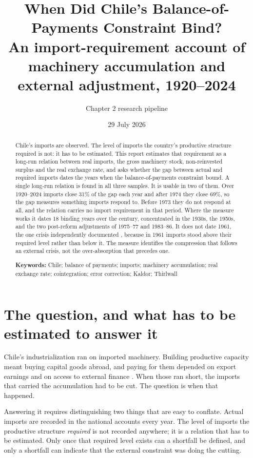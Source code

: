 \documentclass[11pt]{article}
\title{\textbf{When Did Chile's Balance-of-Payments Constraint Bind?}\\
\large An import-requirement account of machinery accumulation and external adjustment, 1920--2024}
\author{Chapter 2 research pipeline}
\date{29 July 2026}
\begin{document}
\maketitle

\begin{abstract}
Chile's imports are observed. The level of imports the country's productive structure required is not: it has to be estimated. This report estimates that requirement as a long-run relation between real imports, the gross machinery stock, non-reinvested surplus and the real exchange rate, and asks whether the gap between actual and required imports dates the years when the balance-of-payments constraint bound. A single long-run relation is found in all three samples. It is usable in two of them. Over 1920--2024 imports close 31\% of the gap each year and after 1974 they close 69\%, so the gap measures something imports respond to. Before 1973 they do not respond at all, and the relation carries no import requirement in that period. Where the measure works it dates 18 binding years over the century, concentrated in the 1930s, the 1950s, and the two post-reform adjustments of 1975--77 and 1983--86. It does not date 1961, the one crisis independently documented \citep{bcch2025}, because in 1961 imports stood above their required level rather than below it. The measure identifies the compression that follows an external crisis, not the over-absorption that precedes one.

\vspace{0.5em}\noindent\textbf{Keywords:} Chile; balance of payments; imports; machinery accumulation; real exchange rate; cointegration; error correction; Kaldor; Thirlwall
\end{abstract}

\FloatBarrier
\section{The question, and what has to be estimated to answer it}

Chile's industrialization ran on imported machinery. Building productive capacity meant buying capital goods abroad, and paying for them depended on export earnings and on access to external finance \citep{bcch2025,alvarez2003}. When those ran short, the imports that carried the accumulation had to be cut. The question is when that happened.

Answering it requires distinguishing two things that are easy to conflate. Actual imports are recorded in the national accounts every year. The level of imports the productive structure \emph{required} is not recorded anywhere; it is a relation that has to be estimated. Only once that required level exists can a shortfall be defined, and only a shortfall can indicate that the external constraint was doing the cutting.
\end{document}

